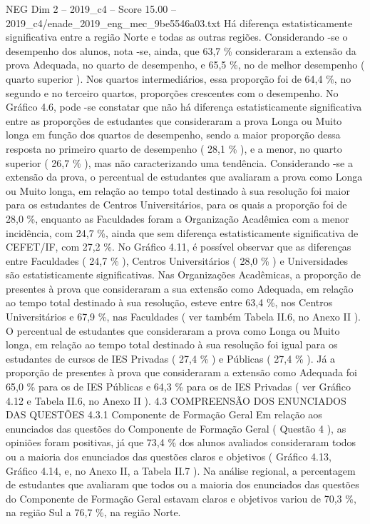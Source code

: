 \begin{textsample}{NEG Dim 2 – 2019\_c4 – Score 15.00 – 2019\_c4/enade\_2019\_eng\_mec\_9be5546a03.txt}
Há diferença estatisticamente significativa entre a região Norte e todas as outras regiões.
Considerando -se o desempenho dos alunos, nota -se, ainda, que 63,7 \% consideraram a extensão da prova Adequada, no quarto de desempenho, e 65,5 \%, no de melhor desempenho ( quarto superior ).
Nos quartos intermediários, essa proporção foi de 64,4 \%, no segundo e no terceiro quartos, proporções crescentes com o desempenho.
No Gráfico 4.6, pode -se constatar que não há diferença estatisticamente significativa entre as proporções de estudantes que consideraram a prova Longa ou Muito longa em função dos quartos de desempenho, sendo a maior proporção dessa resposta no primeiro quarto de desempenho ( 28,1 \% ), e a menor, no quarto superior ( 26,7 \% ), mas não caracterizando uma tendência.
Considerando -se a extensão da prova, o percentual de estudantes que avaliaram a prova como Longa ou Muito longa, em relação ao tempo total destinado à sua resolução foi maior para os estudantes de Centros Universitários, para os quais a proporção foi de 28,0 \%, enquanto as Faculdades foram a Organização Acadêmica com a menor incidência, com 24,7 \%, ainda que sem diferença estatisticamente significativa de CEFET/IF, com 27,2 \%.
No Gráfico 4.11, é possível observar que as diferenças entre Faculdades ( 24,7 \% ), Centros Universitários ( 28,0 \% ) e Universidades são estatisticamente significativas.
Nas Organizações Acadêmicas, a proporção de presentes à prova que consideraram a sua extensão como Adequada, em relação ao tempo total destinado à sua resolução, esteve entre 63,4 \%, nos Centros Universitários e 67,9 \%, nas Faculdades ( ver também Tabela II.6, no Anexo II ).
O percentual de estudantes que consideraram a prova como Longa ou Muito longa, em relação ao tempo total destinado à sua resolução foi igual para os estudantes de cursos de IES Privadas ( 27,4 \% ) e Públicas ( 27,4 \% ).
Já a proporção de presentes à prova que consideraram a extensão como Adequada foi 65,0 \% para os de IES Públicas e 64,3 \% para os de IES Privadas ( ver Gráfico 4.12 e Tabela II.6, no Anexo II ). 4.3 COMPREENSÃO DOS ENUNCIADOS DAS QUESTÕES 4.3.1 Componente de Formação Geral Em relação aos enunciados das questões do Componente de Formação Geral ( Questão 4 ), as opiniões foram positivas, já que 73,4 \% dos alunos avaliados consideraram todos ou a maioria dos enunciados das questões claros e objetivos ( Gráfico 4.13, Gráfico 4.14, e, no Anexo II, a Tabela II.7 ).
Na análise regional, a percentagem de estudantes que avaliaram que todos ou a maioria dos enunciados das questões do Componente de Formação Geral estavam claros e objetivos variou de 70,3 \%, na região Sul a 76,7 \%, na região Norte.

\end{textsample}
